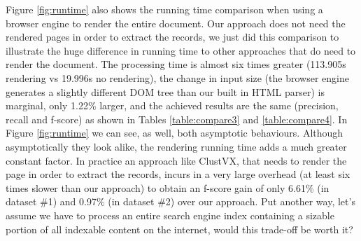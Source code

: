 Figure \ref{fig:runtime} also shows the running time comparison when using a
browser engine to render the entire document. Our approach does not need the
rendered pages in order to extract the records, we just did this comparison to
illustrate the huge difference in running time to other approaches that do need
to render the document. The processing time is almost six times greater
(113.905s rendering vs 19.996s no rendering), the change in input size (the
browser engine generates a slightly different DOM tree than our built in HTML
parser) is marginal, only 1.22\% larger, and the achieved results are the
same (precision, recall and f-score) as shown in Tables \ref{table:compare3}
and \ref{table:compare4}. In Figure \ref{fig:runtime} we can see, as well, both
asymptotic behaviours.
Although asymptotically they look alike, the rendering running time adds a much
greater constant factor. In practice an approach like ClustVX, that needs to
render the page in order to extract the records, incurs in a very large overhead
(at least six times slower than our approach) to obtain an f-score gain of only
6.61\% (in dataset \#1) and 0.97\% (in dataset \#2) over our approach. Put
another way, let's assume we have to process an entire search engine index
containing a sizable portion of all indexable content on the internet, would
this trade-off be worth it?

\vspace{-0.3cm}

